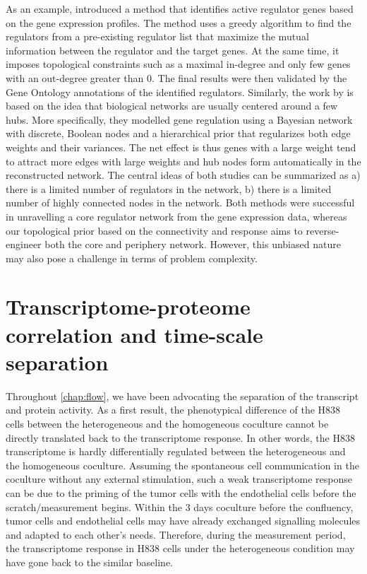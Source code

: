As an example, \cite{Pe'er2002} introduced a method that
identifies active regulator genes based on the gene expression
profiles. The method uses a greedy algorithm to find the 
regulators from a pre-existing 
regulator list that maximize the mutual information between 
the regulator and the target genes. At the same time, it 
imposes topological constraints such
as a maximal in-degree and only few genes with an out-degree
greater than 0. The final results were then validated by
the Gene Ontology annotations of the identified regulators.
Similarly, the work by \cite{Boeck2012} is based on the idea 
that biological 
networks are usually centered around a few hubs. More specifically, they modelled gene regulation using a Bayesian network with discrete, Boolean nodes and a hierarchical prior that
regularizes both edge weights and their variances. The net effect is thus genes with a large weight tend to attract more
edges with large weights and hub nodes form automatically 
in the 
reconstructed network. The central ideas of both studies 
can be summarized as a) there is a limited number
of regulators in the network, b) there is a limited number
of highly connected nodes in the network. Both methods were
successful in unravelling a core regulator network from the
gene expression data, whereas our topological prior based on
the connectivity and response aims to reverse-engineer both
the core and periphery network. However, this unbiased
nature may also pose a challenge in terms of problem
complexity.

\section{Transcriptome-proteome correlation and time-scale 
separation}
Throughout \ref{chap:flow}, we have been advocating the 
separation of the transcript and protein activity. As a first
result, the phenotypical difference of the H838 cells between
the heterogeneous and the homogeneous coculture cannot be
directly translated back to the transcriptome response. In other words,
the H838 transcriptome is hardly differentially regulated
between the heterogeneous and the homogeneous coculture. 
Assuming the spontaneous cell communication in the coculture
without any external stimulation,
such a weak transcriptome response can be due to the priming
of the tumor cells with the endothelial cells before the
scratch/measurement begins. Within the 3 days coculture
before the confluency, tumor cells and endothelial cells
may have already exchanged signalling molecules and adapted
to each other's needs. Therefore, during the measurement
period, the transcriptome response in H838 cells 
under the heterogeneous condition
may have gone back to the similar baseline.

